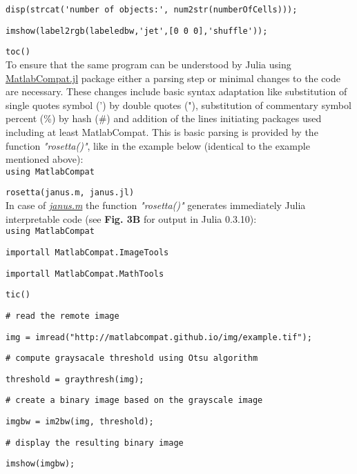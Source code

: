 \verb|disp(strcat('number of objects:', num2str(numberOfCells)));|

\verb|imshow(label2rgb(labeledbw,'jet',[0 0 0],'shuffle'));|

\verb|toc()|\\



To ensure that the same program can be understood by Julia using \href{https://github.com/MatlabCompat/MatlabCompat.jl}{MatlabCompat.jl} package either a parsing step or minimal changes to the code are necessary. These changes include basic syntax adaptation like substitution of single quotes symbol (') by double quotes ("), substitution of commentary symbol percent (\%) by hash (\#) and addition of the lines initiating packages used including at least MatlabCompat. This is basic parsing is provided by the function \textit{"rosetta()"}, like in the example below (identical to the example mentioned above):\\



\verb|using MatlabCompat|

\verb|rosetta(janus.m, janus.jl)|\\



In case of \textit{\href{https://github.com/MatlabCompat/MatlabCompat.jl/blob/master/test/janus.m}{janus.m}} the function \textit{"rosetta()"} generates immediately Julia interpretable code (see \textbf{Fig. 3B} for output in Julia 0.3.10):\\



\verb|using MatlabCompat|

\verb|importall MatlabCompat.ImageTools|

\verb|importall MatlabCompat.MathTools|

\verb|tic()|

\verb|# read the remote image|

\verb|img = imread("http://matlabcompat.github.io/img/example.tif");|

\verb|# compute graysacale threshold using Otsu algorithm|

\verb|threshold = graythresh(img);|

\verb|# create a binary image based on the grayscale image|

\verb|imgbw = im2bw(img, threshold);|

\verb|# display the resulting binary image|

\verb|imshow(imgbw);|

